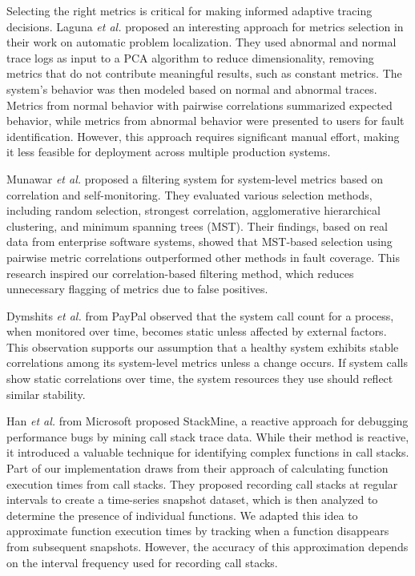 \documentclass[pdflatex,sn-nature]{sn-jnl}%
\theoremstyle{thmstyleone}%
\theoremstyle{thmstyletwo}%
\theoremstyle{thmstylethree}%
\begin{document}
Selecting the right metrics is critical for making informed adaptive tracing decisions. Laguna \textit{et al.} \cite{laguna2013automatic} proposed an interesting approach for metrics selection in their work on automatic problem localization. They used abnormal and normal trace logs as input to a PCA algorithm to reduce dimensionality, removing metrics that do not contribute meaningful results, such as constant metrics. The system's behavior was then modeled based on normal and abnormal traces. Metrics from normal behavior with pairwise correlations summarized expected behavior, while metrics from abnormal behavior were presented to users for fault identification. However, this approach requires significant manual effort, making it less feasible for deployment across multiple production systems.

Munawar \textit{et al.} \cite{munawar2009filtering} proposed a filtering system for system-level metrics based on correlation and self-monitoring. They evaluated various selection methods, including random selection, strongest correlation, agglomerative hierarchical clustering, and minimum spanning trees (MST). Their findings, based on real data from enterprise software systems, showed that MST-based selection using pairwise metric correlations outperformed other methods in fault coverage. This research inspired our correlation-based filtering method, which reduces unnecessary flagging of metrics due to false positives.

Dymshits \textit{et al.} \cite{dymshits2017process} from PayPal observed that the system call count for a process, when monitored over time, becomes static unless affected by external factors. This observation supports our assumption that a healthy system exhibits stable correlations among its system-level metrics unless a change occurs. If system calls show static correlations over time, the system resources they use should reflect similar stability.

Han \textit{et al.} \cite{han2012performance} from Microsoft proposed StackMine, a reactive approach for debugging performance bugs by mining call stack trace data. While their method is reactive, it introduced a valuable technique for identifying complex functions in call stacks. Part of our implementation draws from their approach of calculating function execution times from call stacks. They proposed recording call stacks at regular intervals to create a time-series snapshot dataset, which is then analyzed to determine the presence of individual functions. We adapted this idea to approximate function execution times by tracking when a function disappears from subsequent snapshots. However, the accuracy of this approximation depends on the interval frequency used for recording call stacks.
\end{document}
